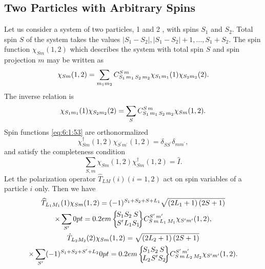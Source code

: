\subsection{Two Particles with Arbitrary Spins}\label{sec:6.1.6}
Let us consider a system of two particles, 1 and 2 , with spins $S_{1}$ and $S_{2}$. Total spin $S$ of the system takes the values $\left|S_{1}-S_{2}\right|,\left|S_{1}-S_{2}\right|+1, \ldots, S_{1}+S_{2}$. The spin function $\chi_{S m}(1,2)$ which describes the system with total spin $S$ and spin projection $m$ may be written as
\begin{equation}
\chi_{S m}(1,2)=\sum_{m_{1} m_{2}} C_{S_{1}\,m_{1}\,S_{2}\,m_{2}}^{S\,m} \chi_{S_{1} m_{1}}(1) \chi_{S_{2} m_{2}}(2) . \label{eq:6:1:53}
\end{equation}
The inverse relation is
\begin{equation}
\chi_{S_{1} m_{1}}(1) \chi_{S_{2} m_{2}}(2)=\sum_{S} C_{S_{1}\,m_{1}\,S_{2}\,m_{2}}^{S\,m} \chi_{S m}(1,2) . \label{eq:6:1:54}
\end{equation}
Spin functions \eqref{eq:6:1:53} are orthonormalized
\begin{equation}
\chi_{S m}^{\dagger}(1,2) \chi_{S^{\prime} m^{\prime}}(1,2)=\delta_{S S^{\prime}} \delta_{m m^{\prime}} , \label{eq:6:1:55}
\end{equation}
and satisfy the completeness condition
\begin{equation}
\sum_{S, m} \chi_{S m}(1,2) \chi_{S m}^{\dagger}(1,2)=\widehat{I}. \label{eq:6:1:56}
\end{equation}
Let the polarization operator $\widehat{T}_{L M}(i)(i=1,2)$ act on spin variables of a particle $i$ only. Then we have
\begin{gather}
\widehat{T}_{L_{1} M_{1}}(1) \chi_{S m}(1,2)=(-1)^{S_{1}+S_{2}+S+L_{1}} \sqrt{\left(2 L_{1}+1\right)(2 S+1)} \notag\\
\times \sum_{S^{\prime}}\sixj{S_{1}}{S_{2}}{S}{S^{\prime}}{L_{1}}{S_{1}} \clebsch{S}{m}{L_{1}}{M_{1}}{S^{\prime}}{m^{\prime}} \chi_{S^{\prime} m^{\prime}}(1,2) , \label{eq:6:1:57}\\
\hat{T}_{L_{2} M_{2}}(2) \chi_{S m}(1,2)=\sqrt{\left(2 L_{2}+1\right)(2 S+1)}  \notag\\
\times \sum_{S^{\prime}}(-1)^{S_{1}+S_{2}+S^{\prime}+L_{2}}\sixj{S_{1}}{S_{2}}{S}{L_{2}}{S^{\prime}}{S_{2}} \clebsch{S}{m}{L_{2}}{M_{2}}{S^{\prime}}{m^{\prime}} \chi_{S^{\prime} m^{\prime}}(1,2) . \label{eq:6:1:58}
\end{gather}
